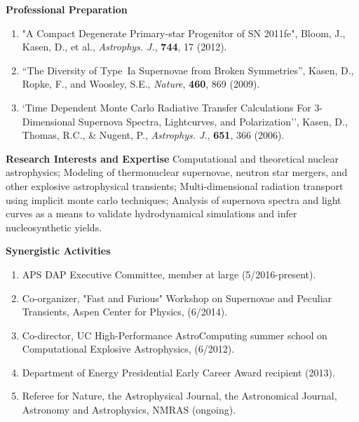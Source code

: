 \documentclass[11pt,letterpaper,english]{article}
\begin{document}
\begin{flushleft} {\bf Professional Preparation}
\begin{enumerate}
\item "A Compact Degenerate Primary-star Progenitor of SN 2011fe", Bloom, J., Kasen, D., et al., \emph{Astrophys. J.}, {\bf 744}, 17 (2012).

\item  ``The Diversity of Type~Ia Supernovae from Broken Symmetries'', Kasen, D., Ropke, F., and Woosley, S.E., \emph {Nature},  {\bf 460}, 869 (2009).

\item `Time Dependent Monte Carlo Radiative Transfer Calculations For
3-Dimensional Supernova Spectra, Lightcurves, and Polarization'', Kasen, D., Thomas, R.C., \& Nugent, P., \emph{Astrophys. J.}, {\bf 651}, 366 (2006). 

\end{enumerate} 

\vspace{-6pt}
{\bf Research Interests and Expertise}
{\parindent 16pt
Computational and theoretical nuclear astrophysics; Modeling of thermonuclear supernovae, neutron star mergers, and other explosive astrophysical transients; Multi-dimensional radiation transport using implicit monte carlo techniques;  Analysis of supernova spectra and light curves as a means to validate hydrodynamical simulations and infer nucleosynthetic yields. 
}


\vspace{.04in}
{\bf Synergistic Activities}
\vspace{-6pt}
\begin{enumerate} \itemsep1pt \parskip0pt 
\item APS DAP Executive Committee, member at large (5/2016-present).
\item Co-organizer, "Fast and Furious" Workshop on Supernovae and Peculiar Transients, Aspen Center for Physics, (6/2014).
\item Co-director, UC High-Performance AstroComputing summer school on Computational Explosive Astrophysics, (6/2012).
\item Department of Energy Presidential Early Career Award recipient (2013).
\item Referee for Nature, the Astrophysical Journal, the Astronomical Journal, Astronomy and Astrophysics, NMRAS (ongoing).
\end{enumerate} 


\end{flushleft}
\end{document}

